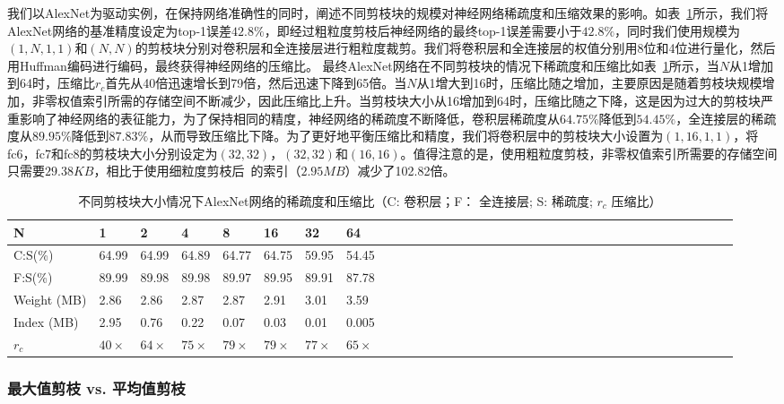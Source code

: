 我们以AlexNet为驱动实例，在保持网络准确性的同时，阐述不同剪枝块的规模对神经网络稀疏度和压缩效果的影响。如表~\ref{tab:blocksize}所示，我们将AlexNet网络的基准精度设定为top-1误差$42.8\%$，即经过粗粒度剪枝后神经网络的最终top-1误差需要小于$42.8\%$，同时我们使用规模为$(1,N,1,1)$和$(N,N)$的剪枝块分别对卷积层和全连接层进行粗粒度裁剪。我们将卷积层和全连接层的权值分别用8位和4位进行量化，然后用Huffman编码进行编码，最终获得神经网络的压缩比。
最终AlexNet网络在不同剪枝块的情况下稀疏度和压缩比如表~\ref{tab:blocksize}所示，当$N$从1增加到64时，压缩比$r_c$首先从40倍迅速增长到79倍，然后迅速下降到65倍。当$N$从1增大到16时，压缩比随之增加，主要原因是随着剪枝块规模增加，非零权值索引所需的存储空间不断减少，因此压缩比上升。当剪枝块大小从16增加到64时，压缩比随之下降，这是因为过大的剪枝块严重影响了神经网络的表征能力，为了保持相同的精度，神经网络的稀疏度不断降低，卷积层稀疏度从$64.75\%$降低到$54.45\%$，全连接层的稀疏度从$89.95\%$降低到$87.83\%$，从而导致压缩比下降。为了更好地平衡压缩比和精度，我们将卷积层中的剪枝块大小设置为$(1,16,1,1)$，将fc6，fc7和fc8的剪枝块大小分别设定为$(32,32)$，$(32,32)$和$(16,16)$。值得注意的是，使用粗粒度剪枝，非零权值索引所需要的存储空间只需要$29.38KB$，相比于使用细粒度剪枝后~\cite{han2015deep}的索引（$2.95MB$）减少了102.82倍。

\begin{table}[h]
\centering
\caption{ 不同剪枝块大小情况下AlexNet网络的稀疏度和压缩比（C: 卷积层；F： 全连接层; S: 稀疏度; $r_c$ 压缩比）}
\label{tab:blocksize}
\begin{tabular}{lll@{~}llll@{~}llll@{~}llll@{~~}llll@{~~}llll@{~~}llll@{~~}lllllllll}
\toprule
N  				& 1 	&  2		& 4			& 8			& 16		& 32 		&64		\\
\midrule
C:S(\%)			& 64.99 &64.99		&64.89		&64.77		&64.75		&59.95		&54.45 	\\
F:S(\%) 		& 89.99	&89.98		&89.98		&89.97		&89.95		&89.91		&87.78	\\
Weight (MB)     & 2.86 	&2.86		&2.87		&2.87		&2.91		&3.01		&3.59	\\
Index (MB)      & 2.95	&0.76		&0.22		&0.07		&0.03		&0.01		&0.005	\\
$r_c$ 			& $40\times$ 	&$64\times$		&$75\times$		&$79\times$		&$79\times$		&$77\times$		&$65\times$	\\
\bottomrule
\end{tabular}
\end{table}

\subsubsection{最大值剪枝 vs. 平均值剪枝}



